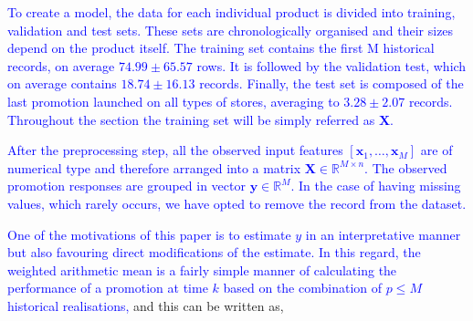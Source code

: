 \documentclass{ieeeaccess}
\newcommand{\myblue}[1]{\textcolor{blue}{#1}}
\begin{document}
\myblue{To create a model, the data for each individual product is divided into training, validation and test sets. These sets are chronologically organised and their sizes depend on the product itself. 
The training set contains the first M historical records, on average $74.99 \pm 65.57$ rows. It is followed by the validation test, which on average contains $18.74 \pm 16.13$ records. Finally, the test set is composed of the last promotion launched on all types of stores, averaging to $3.28 \pm 2.07$ records. Throughout the section the training set will be simply referred as $\mathbf{X}$.}

\myblue{After the preprocessing step, all the observed input features $\left[\mathbf{x}_1,\dots,\mathbf{x}_M\right]$ are of numerical type and therefore arranged into a matrix $\mathbf{X} \in \mathbb{R}^{M \times n}$. The observed promotion responses are grouped in vector $\mathbf{y} \in \mathbb{R}^{M}$. In the case of having missing values, which rarely occurs, we have opted to remove the record from the dataset.}





\myblue{One of the motivations of this paper is to estimate $y$ in an interpretative manner but also favouring direct modifications of the estimate. In this regard, the weighted arithmetic mean is a fairly simple manner of calculating the performance of a promotion at time $k$ based on the combination of $p \leq M$ historical realisations,} and this can be written as,
\end{document}
